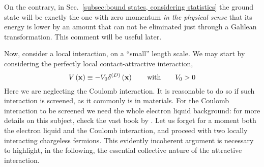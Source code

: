 On the contrary, in Sec.~\ref{subsec:bound states, considering statistics} the ground state will be exactly the one with zero momentum \textit{in the physical sense} that its energy is lower by an amount that can not be eliminated just through a Galilean transformation. This comment will be useful later.

Now, consider a local interaction, on a ``small'' length scale. We may start by considering the perfectly local contact-attractive interaction,
\[
	V \lrR{\mathbf{x}} \equiv - V_0 \delta^{(D)} \lrR{\mathbf{x}}
	\quad\qq{with}\quad
	V_0 > 0
\]
Here we are neglecting the Coulomb interaction. It is reasonable to do so if such interaction is screened, as it commonly is in materials. For the Coulomb interaction to be screened we need the whole electron liquid background: for more details on this subject, check the vast book  \cite{giuliani2008quantum} by \citeauthor{giuliani2008quantum}. Let us forget for a moment both the electron liquid and the Coulomb interaction, and proceed with two locally interacting chargeless fermions. This evidently incoherent argument is necessary to highlight, in the following, the essential collective nature of the attractive interaction.

